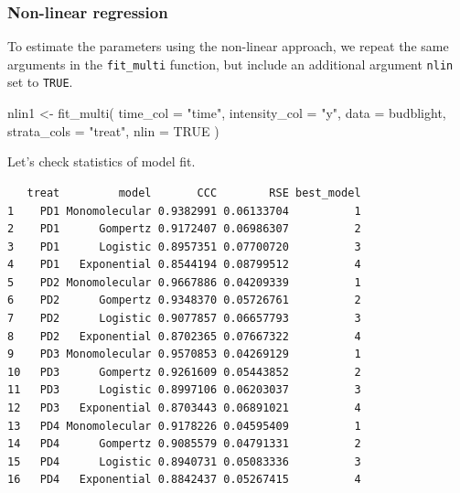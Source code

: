 \documentclass[
  letterpaper,
]{book}
\newenvironment{Shaded}{\begin{snugshade}}{\end{snugshade}}
\newcommand{\AttributeTok}[1]{\textcolor[rgb]{0.40,0.45,0.13}{#1}}
\newcommand{\ConstantTok}[1]{\textcolor[rgb]{0.56,0.35,0.01}{#1}}
\newcommand{\FunctionTok}[1]{\textcolor[rgb]{0.28,0.35,0.67}{#1}}
\newcommand{\NormalTok}[1]{\textcolor[rgb]{0.00,0.23,0.31}{#1}}
\newcommand{\OtherTok}[1]{\textcolor[rgb]{0.00,0.23,0.31}{#1}}
\newcommand{\SpecialCharTok}[1]{\textcolor[rgb]{0.37,0.37,0.37}{#1}}
\newcommand{\StringTok}[1]{\textcolor[rgb]{0.13,0.47,0.30}{#1}}
\begin{document}
\hypertarget{non-linear-regression-1}{%
\subsubsection{Non-linear regression}\label{non-linear-regression-1}}

To estimate the parameters using the non-linear approach, we repeat the
same arguments in the \texttt{fit\_multi} function, but include an
additional argument \texttt{nlin} set to \texttt{TRUE}.

\begin{Shaded}
\begin{Highlighting}[]
\NormalTok{nlin1 }\OtherTok{\textless{}{-}} \FunctionTok{fit\_multi}\NormalTok{(}
  \AttributeTok{time\_col =} \StringTok{"time"}\NormalTok{,}
  \AttributeTok{intensity\_col =} \StringTok{"y"}\NormalTok{,}
  \AttributeTok{data =}\NormalTok{ budblight,}
  \AttributeTok{strata\_cols =} \StringTok{"treat"}\NormalTok{,}
  \AttributeTok{nlin =} \ConstantTok{TRUE}
\NormalTok{)}
\end{Highlighting}
\end{Shaded}

Let's check statistics of model fit.

\begin{Shaded}
\end{Shaded}

\begin{verbatim}
   treat         model       CCC        RSE best_model
1    PD1 Monomolecular 0.9382991 0.06133704          1
2    PD1      Gompertz 0.9172407 0.06986307          2
3    PD1      Logistic 0.8957351 0.07700720          3
4    PD1   Exponential 0.8544194 0.08799512          4
5    PD2 Monomolecular 0.9667886 0.04209339          1
6    PD2      Gompertz 0.9348370 0.05726761          2
7    PD2      Logistic 0.9077857 0.06657793          3
8    PD2   Exponential 0.8702365 0.07667322          4
9    PD3 Monomolecular 0.9570853 0.04269129          1
10   PD3      Gompertz 0.9261609 0.05443852          2
11   PD3      Logistic 0.8997106 0.06203037          3
12   PD3   Exponential 0.8703443 0.06891021          4
13   PD4 Monomolecular 0.9178226 0.04595409          1
14   PD4      Gompertz 0.9085579 0.04791331          2
15   PD4      Logistic 0.8940731 0.05083336          3
16   PD4   Exponential 0.8842437 0.05267415          4
\end{verbatim}
\end{document}

